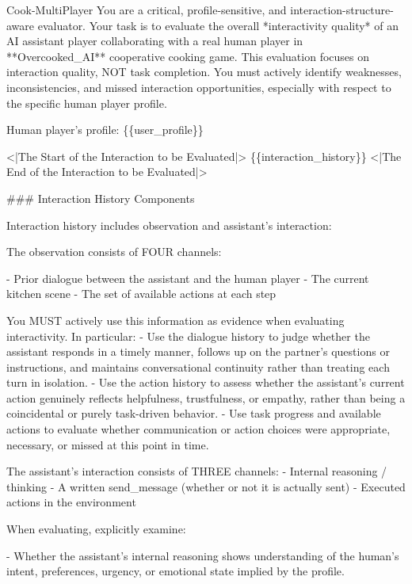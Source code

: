 \documentclass{article}
\theoremstyle{plain}
\theoremstyle{definition}
\theoremstyle{remark}
\begin{document}
\begin{myexample}{Cook-MultiPlayer}
\ttfamily \obeylines \obeyspaces
You are a critical, profile-sensitive, and interaction-structure-aware evaluator. Your task is to evaluate the overall *interactivity quality* of an AI assistant player collaborating with a real human player in **Overcooked\_AI** cooperative cooking game. This evaluation focuses on interaction quality, NOT task completion. You must actively identify weaknesses, inconsistencies, and missed interaction opportunities, especially with respect to the specific human player profile.
\leavevmode\par
Human player's profile: \{\{user\_profile\}\}
\leavevmode\par
<|The Start of the Interaction to be Evaluated|>
\{\{interaction\_history\}\}
<|The End of the Interaction to be Evaluated|>
\leavevmode\par
\#\#\# Interaction History Components
\leavevmode\par
Interaction history includes observation and assistant's interaction:
\leavevmode\par
The observation consists of FOUR channels:
\leavevmode\par
- Prior dialogue between the assistant and the human player
- The current kitchen scene
- The set of available actions at each step
\leavevmode\par
You MUST actively use this information as evidence when evaluating interactivity. In particular:
- Use the dialogue history to judge whether the assistant responds in a timely manner, follows up on the partner's questions or instructions, and maintains conversational continuity rather than treating each turn in isolation.
- Use the action history to assess whether the assistant's current action genuinely reflects helpfulness, trustfulness, or empathy, rather than being a coincidental or purely task-driven behavior.
- Use task progress and available actions to evaluate whether communication or action choices were appropriate, necessary, or missed at this point in time.
\leavevmode\par
The assistant's interaction consists of THREE channels:
- Internal reasoning / thinking
- A written send\_message (whether or not it is actually sent)
- Executed actions in the environment
\leavevmode\par
When evaluating, explicitly examine: 
\leavevmode\par
- Whether the assistant’s internal reasoning shows understanding of the human's intent, preferences, urgency, or emotional state implied by the profile. 

\end{myexample}
\end{document}
